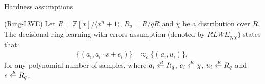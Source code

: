 \begin{section}{Hardness assumptions}

  \begin{definition}{(Ring-LWE)}
    Let $R = \mathbb{Z}[x] /\langle x^n +1\rangle$, $R_q = R/ qR$ and $\chi$ be a distribution over $R$.
    The decisional ring learning with errors assumption (denoted by $RLWE_{q, \chi}$) states that:
    \begin{align*}
      \{ (a_i, a_i \cdot s + e_i)\} &\approx_c \{(a_i, u_i)\},
    \end{align*}
    for any polynomial number of samples, where $a_i \stackrel{{\scriptscriptstyle \mkern4mu R}}{\gets} R_q$, $e_i \stackrel{{\scriptscriptstyle \mkern4mu R}}{\gets} \chi$, $u_i \stackrel{{\scriptscriptstyle \mkern4mu R}}{\gets} R_q$ and $s \stackrel{{\scriptscriptstyle \mkern4mu R}}{\gets} R_q$.
  \end{definition}

\end{section}